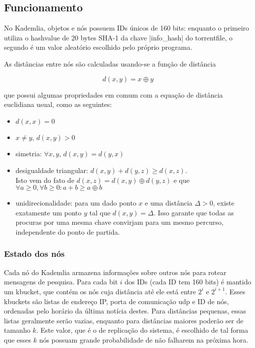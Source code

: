 \subsection*{Funcionamento}

No Kademlia, objetos e nós possuem IDs únicos de 160 bits: enquanto o primeiro utiliza
o \gls*{hashvalue} de 20 bytes SHA-1 da chave \bverb|info_hash| do \gls*{torrentfile},
o segundo é um valor aleatório escolhido pelo próprio programa.

As distâncias entre nós são calculadas usando-se a função de distância

\begin{equation}
    d(x,y) = x \oplus y
\end{equation}

que possui algumas propriedades em comum com a equação de distância euclidiana usual,
como as seguintes:

\begin{itemize}
    \item $d(x,x) = 0$
    \item $x \neq y$, $d(x,y) > 0$
    \item simetria: $\forall x,y$, $d(x,y) = d(y,x)$
    \item desigualdade triangular: $d(x,y) + d(y,z) \geq d(x,z)$. \\
        Isto vem do fato de $d(x,z) = d(x,y) \oplus d(y,z)$ e que $\forall a \geq 0,
        \forall b \geq 0 : a + b \geq a \oplus b$
    \item unidirecionalidade: para um dado ponto $x$ e uma distância $\Delta > 0$,
        existe exatamente um ponto $y$ tal que $d(x,y) = \Delta$. Isso garante que todas
        as procuras por uma mesma chave convirjam para um mesmo percurso, independente
        do ponto de partida.
\end{itemize}

\subsubsection*{Estado dos nós}

Cada nó do Kademlia armazena informações sobre outros nós para rotear mensagens de
pesquisa. Para cada bit $i$ dos IDs (cada ID tem 160 bits) é mantido um \gls{kbucket},
que contém os nós cuja distância até ele está entre $2^i$ e $2^{i+1}$. Esses
\glspl*{kbucket} são listas de endereço IP, porta de comunicação \gls*{udp} e ID de
nós, ordenadas pelo horário da última notícia destes. Para distâncias pequenas, essas
listas geralmente serão vazias, enquanto para distâncias maiores poderão ser de tamanho
$k$. Este valor, que é o de replicação do sistema, é escolhido de tal forma que esses
$k$ nós possuam grande probabilidade de não falharem na próxima hora.

